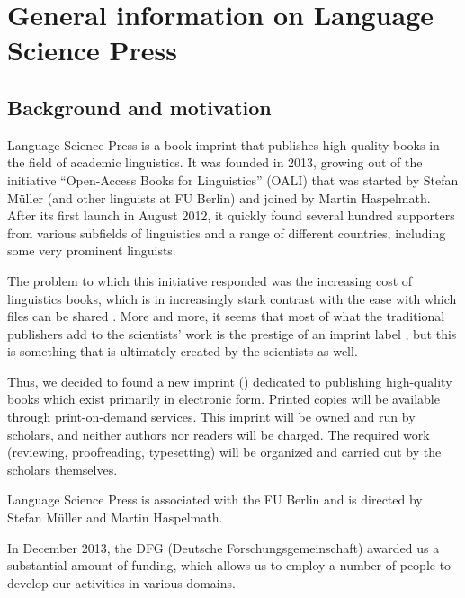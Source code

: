 \chapter{General information on Language Science Press}


\section{Background and motivation}

Language Science Press is a book imprint that publishes high-quality books in the field of academic
linguistics. It was founded in 2013, growing out of the initiative ``Open-Access Books for
Linguistics'' (OALI) that was started by Stefan Müller (and other linguists at FU Berlin) and joined
by Martin Haspelmath. After its first launch in August 2012, it quickly found several hundred
supporters from various subfields of linguistics and a range of different countries, including some
very prominent linguists.

The problem to which this initiative responded was the increasing cost of linguistics books, which
is in increasingly stark contrast with the ease with which files can be shared
\citep{MuellerOA}. More and more, it seems that most of what the traditional publishers add to the
scientists' work is the prestige of an imprint label \citep{Haspelmath2012a}, but this is something
that is ultimately created by the scientists as well.

Thus, we decided to found a new imprint (\lsp) dedicated to publishing high-quality books which exist primarily in electronic form. Printed copies will be available through print-on-demand services. This imprint will be owned and run by scholars, and neither authors nor readers will be charged. The required work (reviewing, proofreading, typesetting) will be organized and carried out by the scholars themselves.

Language Science Press is associated with the FU Berlin and is directed by Stefan Müller and Martin Haspelmath.

In December 2013, the DFG (Deutsche Forschungsgemeinschaft) awarded us a substantial amount of funding, which allows us to employ a number of people to develop our activities in various domains.



